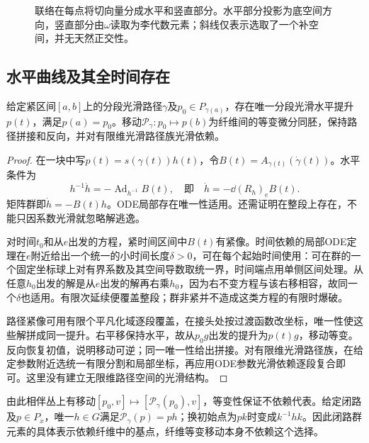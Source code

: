 \begin{figure}[htbp]
\centering
\caption{联络在每点将切向量分成水平和竖直部分。水平部分投影为底空间方向，竖直部分由$\omega$读取为李代数元素；斜线仅表示选取了一个补空间，并无天然正交性。}
\label{fig:principal-horizontal}
\end{figure}

\subsection{水平曲线及其全时间存在}
\begin{theorem}\label{thm:principal-transport}
给定紧区间$[a,b]$上的分段光滑路径$\gamma$及$p_0\in P_{\gamma(a)}$，存在唯一分段光滑水平提升$p(t)$，满足$p(a)=p_0$。移动$\mathcal P_\gamma:p_0\mapsto p(b)$为纤维间的等变微分同胚，保持路径拼接和反向，并对有限维光滑路径族光滑依赖。
\end{theorem}
\begin{proof}
在一块中写$p(t)=s(\gamma(t))h(t)$，令$B(t)=A_{\gamma(t)}(\dot\gamma(t))$。水平条件为
\begin{equation}\label{eq:principal-horizontal-ode}
 h^{-1}\dot h=-\operatorname{Ad}_{h^{-1}}B(t),
 \quad\text{即}\quad \dot h=-\dd(R_h)_eB(t).
\end{equation}
矩阵群即$\dot h=-B(t)h$。ODE局部存在唯一性适用。还需证明在整段上存在，不能只因系数光滑就忽略解逃逸。

对时间$t_0$和从$e$出发的方程，紧时间区间中$B(t)$有紧像。时间依赖的局部ODE定理在$e$附近给出一个统一的小时间长度$\delta>0$，可在每个起始时间使用：可在群的一个固定坐标球上对有界系数及其空间导数取统一界，时间端点用单侧区间处理。从任意$h_0$出发的解是从$e$出发的解再右乘$h_0$，因为右不变方程与该右移相容，故同一个$\delta$也适用。有限次延续便覆盖整段；群非紧并不造成这类方程的有限时爆破。

路径紧像可用有限个平凡化域逐段覆盖，在接头处按过渡函数改坐标，唯一性使这些解拼成同一提升。右平移保持水平，故从$p_0g$出发的提升为$p(t)g$，移动等变。反向恢复初值，说明移动可逆；同一唯一性给出拼接。对有限维光滑路径族，在给定参数附近选统一有限分割和局部坐标，再应用ODE参数光滑依赖逐段复合即可。这里没有建立无限维路径空间的光滑结构。
\end{proof}
由此相伴丛上有移动$[p_0,v]\mapsto[\mathcal P_\gamma(p_0),v]$，等变性保证不依赖代表。给定闭路及$p\in P_x$，唯一$h\in G$满足$\mathcal P_\gamma(p)=ph$；换初始点为$pk$时变成$k^{-1}hk$。因此闭路群元素的具体表示依赖纤维中的基点，纤维等变移动本身不依赖这个选择。
